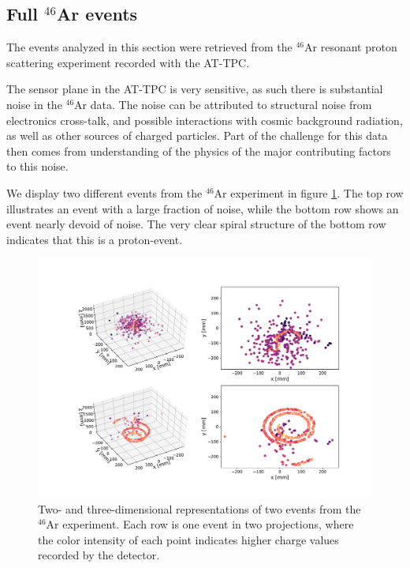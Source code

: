 \documentclass[preprint,12pt]{elsarticle}
\begin{document}
\subsection{Full \texorpdfstring{${}^{46}$Ar}{46Ar}  events}\label{sec:data_real}

The events analyzed in this section were retrieved from the ${}^{46}$Ar resonant proton scattering experiment recorded with the AT-TPC. 

The sensor plane in the AT-TPC is very sensitive, as such there is substantial noise in the ${}^{46}$Ar data. The noise can be attributed to structural noise from electronics cross-talk, and possible interactions with cosmic background radiation, as well as other sources of charged particles. Part of the challenge for this data then comes from understanding of the physics of the major contributing factors to this noise. 

We display two different events from the ${}^{46}$Ar experiment in figure \ref{fig:samples}. The top row illustrates an event with a large fraction of noise, while the bottom row shows an event nearly devoid of noise. The very clear spiral structure of the bottom row indicates that this is a proton-event.

\begin{figure}[ht]
\centering
\includegraphics[width=\textwidth]{plots/display_eventsfull_.pdf}
\caption[Displaying un-filtered events in 2D and 3D]{Two- and three-dimensional representations of two events from the ${}^{46}$Ar experiment. Each row is one event in two projections, where the color intensity of each point indicates higher charge values recorded by the detector.}\label{fig:samples}
\end{figure}
\end{document}
